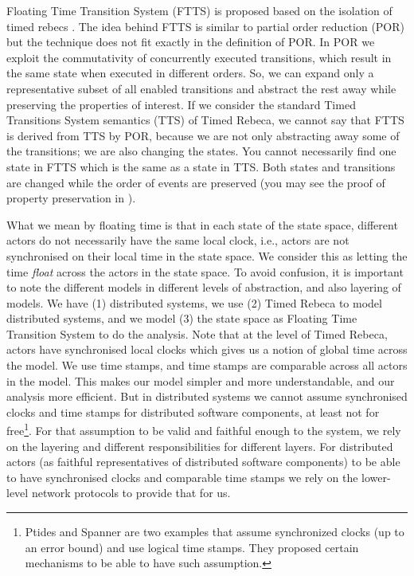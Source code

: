 Floating Time Transition System (FTTS) is proposed based on the isolation of timed rebecs \cite{DBLP:conf/facs2/KhamespanahSVK15,DBLP:journals/scp/KhamespanahSSKI15}. The idea behind FTTS is similar to partial order reduction (POR) but the technique does not fit exactly in the definition of POR. 
%
In POR we exploit the commutativity of concurrently executed transitions, which result in the same state when executed in different orders. So, we can expand only a representative subset of all enabled transitions and abstract the rest away while preserving the properties of interest. %
%
If we consider the standard Timed Transitions System semantics (TTS) of Timed Rebeca, we cannot say that FTTS is derived from TTS by POR, because we are not only abstracting away some of the transitions; we are also changing the states. You cannot necessarily find one state in FTTS which is the same as a state in TTS. Both states and transitions are changed while the order of events are preserved (you may see the proof of property preservation in \cite{DBLP:conf/facs2/KhamespanahSVK15}).
%

What we mean by floating time is that in each state of the state space, different actors do not necessarily have the same local clock, i.e.,  actors are not synchronised on their local time in the state space. We consider this as letting the time \textit{float} across the actors in the state space. 
To avoid confusion, it is important to note the different models in different levels of abstraction, and also layering of models. We have (1) distributed systems, we use (2) Timed Rebeca to model distributed systems, and we model (3) the state space as Floating Time Transition System to do the analysis. 
%
Note that at the level of Timed Rebeca, actors have synchronised local clocks which gives us a notion of global time across the model. We use time stamps, and time stamps are comparable across all actors in the model. This makes our model simpler and more understandable, and our analysis more efficient.
But in distributed systems we cannot assume synchronised clocks and time stamps for distributed software components, at least not for free\footnote{Ptides\cite{DBLP:conf/dsrt/DerlerLM08} and Spanner\cite{Corbett:2013:SGG:2518037.2491245} are two examples that assume synchronized clocks  (up to an error bound) and use logical time stamps.
They proposed certain mechanisms to be able to have such assumption.}. 
For that assumption to be valid and faithful enough to the system,  we rely on the layering and different responsibilities for different layers. For distributed actors (as faithful representatives of distributed software components) to be able to have synchronised clocks and comparable time stamps we rely on the lower-level network protocols to provide that for us. 

